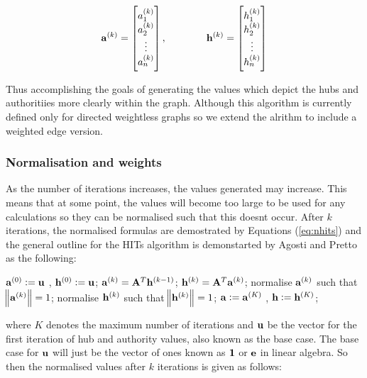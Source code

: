\begin{equation}
\bold{a}^{(k)} = \begin{bmatrix}
           a_1^{(k)} \\
           a_2^{(k)} \\
           \vdots \\
           a_n^{(k)}
         	\end{bmatrix}
           , \qquad \qquad 
\bold{h}^{(k)} = \begin{bmatrix}
           h_{1}^{(k)} \\
           h_{2}^{(k)} \\
           \vdots \\
           h_{n}^{(k)}
         	\end{bmatrix}
\end{equation}

Thus accomplishing the goals of generating the values which depict the hubs and authoritiies more clearly within the graph. Although this algorithm is currently defined only for directed weightless graphs so we extend the alrithm to include a weighted edge version.

\subsubsection{Normalisation and weights}
As the number of iterations increases, the values generated may increase. This means that at some point, the values will become too large to be used for any calculations so they can be normalised such that this doesnt occur. After $k$ iterations, the normalised formulas are demostrated by Equations (\ref{eq:nhits}) and the general outline for the HITs algorithm is demonstarted by Agosti and Pretto\cite{agosti2005theoretical} as the following:

\begin{algorithmic}
\State $\bold{a}^{(0)} := \bold{u}$ ,   $\bold{h}^{(0)} := \bold{u}$;
   		 \State \qquad $\bold{a}^{(k)} = \bold{A}^{T}\bold{h}^{(k-1)}$;
		 \State \qquad $\bold{h}^{(k)} = \bold{A}^{T}\bold{a}^{(k)}$;
		 \State \qquad normalise $\bold{a}^{(k)}$ such that $\norm{\bold{a}^{(k)}} = 1$;
		 \State \qquad normalise $\bold{h}^{(k)}$ such that $\norm{\bold{h}^{(k)}} = 1$;
\EndFor 
\State $\bold{a} := \bold{a}^{(K)}$ ,   $\bold{h} := \bold{h}^{(K)}$;
\end{algorithmic}

where $K$ denotes the maximum number of iterations and $\bold{u}$ be the vector for the first iteration of hub and authority values, also known as the base case. The base case for $\bold{u}$ will just be the vector of ones known as $\bold{1}$ or $\bold{e}$ in linear algebra. So then the normalised values after $k$ iterations is given as follows:


